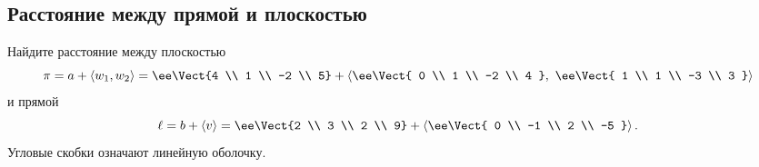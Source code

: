 \subsection{Расстояние между прямой и плоскостью}

Найдите расстояние между плоскостью
\[
	\pi =
	a + \left<w_1, w_2\right>
	=
	\ee
	\Vect{4 \\ 1 \\ -2 \\ 5}
	+
	\left<
		\ee
		\Vect{
			0 \\ 1 \\ -2 \\ 4
		},
		\ 
		\ee
		\Vect{
			1 \\ 1 \\ -3 \\ 3
		}
	\right>
\]
и прямой
\[
	\ell =
	b +
	\left<
		v
	\right>
	=
	\ee
	\Vect{2 \\ 3 \\ 2 \\ 9}
	+
	\left<
		\ee
		\Vect{
			0 \\ -1 \\ 2 \\ -5
		}
	\right>
	.
\]
Угловые скобки означают линейную оболочку.

